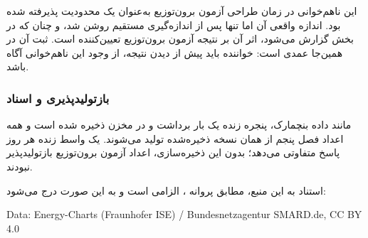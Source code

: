 این ناهم‌خوانی در زمان طراحی آزمون برون‌توزیع به‌عنوان یک محدودیت
پذیرفته شده بود. اندازه واقعی آن اما تنها پس از اندازه‌گیری مستقیم روشن
شد، و چنان که در بخش  گزارش می‌شود، اثر آن بر نتیجه آزمون
برون‌توزیع تعیین‌کننده است. ثبت آن در همین‌جا عمدی است: خواننده باید
پیش از دیدن نتیجه، از وجود این ناهم‌خوانی آگاه باشد.

\subsubsection*{بازتولیدپذیری و اسناد}

مانند داده بنچمارک، پنجره زنده یک بار برداشت و در مخزن ذخیره شده است و
همه اعداد فصل پنجم از همان نسخه ذخیره‌شده تولید می‌شوند. یک واسط زنده
هر روز پاسخ متفاوتی می‌دهد؛ بدون این ذخیره‌سازی، اعداد آزمون برون‌توزیع
بازتولیدپذیر نبودند.

استناد به این منبع، مطابق پروانه ، الزامی است و به این صورت
درج می‌شود:

\begin{center}
\begin{latin}
\small
Data: Energy-Charts (Fraunhofer ISE) / Bundesnetzagentur SMARD.de, CC BY 4.0
\end{latin}
\end{center}
